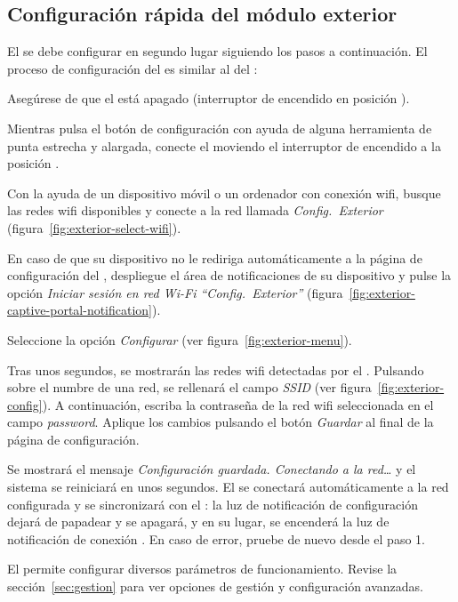 \subsection{Configuración rápida del módulo exterior}

El \MEE se debe configurar en segundo lugar siguiendo los pasos a continuación. El proceso de configuración del \MEE es similar al del \MIE:

\begin{enumeratecompact}

\item Asegúrese de que el \ME está apagado (interruptor de encendido  en posición \off).

\item Mientras pulsa el botón de configuración  con ayuda de alguna herramienta de punta estrecha y alargada, conecte el \ME moviendo el interruptor de encendido  a la posición \on.

\item Con la ayuda de un dispositivo móvil o un ordenador con conexión wifi, busque las redes wifi disponibles y conecte a la red llamada \emph{Config.~Exterior} (figura~\ref{fig:exterior-select-wifi}).

\item En caso de que su dispositivo no le rediriga automáticamente a la página de configuración del \ME, despliegue el área de notificaciones de su dispositivo y pulse la opción \emph{Iniciar sesión en red Wi-Fi ``Config.~Exterior''} (figura~\ref{fig:exterior-captive-portal-notification}).

\item Seleccione la opción \emph{Configurar} (ver figura~\ref{fig:exterior-menu}).

\item Tras unos segundos, se mostrarán las redes wifi detectadas por el \ME. Pulsando sobre el numbre de una red, se rellenará el campo \emph{SSID} (ver figura~\ref{fig:exterior-config}). A continuación, escriba la contraseña de la red wifi seleccionada en el campo \emph{password}. Aplique los cambios pulsando el botón \emph{Guardar} al final de la página de configuración.

\item Se mostrará el mensaje \emph{Configuración guardada. Conectando a la red\ldots} y el sistema se reiniciará en unos segundos. El \ME se conectará automáticamente a la red configurada y se sincronizará con el \MIE: la luz de notificación de configuración  dejará de papadear y se apagará, y en su lugar, se encenderá la luz de notificación de conexión . En caso de error, pruebe de nuevo desde el paso 1.

\end{enumeratecompact}



El \CMS permite configurar diversos parámetros de funcionamiento. Revise la sección~\ref{sec:gestion} para ver opciones de gestión y configuración avanzadas.
\tipend


